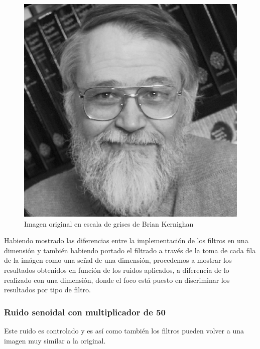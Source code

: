 \begin{figure}[H]
\begin {center}
\includegraphics[width=500pt]{imagenes/brian_kernighan.png}
\end {center}
\caption{Imagen original en escala de grises de Brian Kernighan}
\label{fig:SinProm}
\end{figure}

Habiendo mostrado las diferencias entre la implementaci\'on de los filtros en
una dimensi\'on y tambi\'en habiendo portado el filtrado a trav\'es de la toma de cada
fila de la im\'agen como una se\~nal de una dimensi\'on, procedemos a mostrar
los resultados obtenidos en funci\'on de los ruidos aplicados, a diferencia de
lo realizado con una dimensi\'on, donde el foco est\'a puesto en discriminar los
resultados por tipo de filtro.

\subsubsection{Ruido senoidal con multiplicador de 50}

Este ruido es controlado y es as\'i como tambi\'en los filtros pueden volver a
una imagen muy similar a la original.

